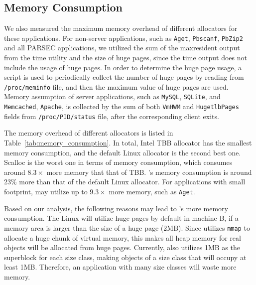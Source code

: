 \subsection{Memory Consumption}
\label{sec:memory}

We also measured the maximum memory overhead of different allocators for these applications. For non-server applications, such as \texttt{Aget}, \texttt{Pbscanf}, \texttt{PbZip2} and all PARSEC applications, we utilized the sum of the maxresident output from the time utility and the size of huge pages, since the time output does not include the usage of huge pages. In order to determine the huge page usage, a script is used to periodically collect the number of huge pages by reading from \texttt{/proc/meminfo} file, and then the maximum value of huge pages are used. Memory assumption of server applications, such as \texttt{MySQL}, \texttt{SQLite}, and \texttt{Memcached}, \texttt{Apache}, is collected by the sum of both \texttt{VmHWM} and \texttt{HugetlbPages} fields from \texttt{/proc/PID/status} file, after the corresponding client exits. 




The memory overhead of different allocators is listed in Table~\ref{tab:memory_consumption}. In total, Intel TBB allocator has the smallest memory consumption, and the default Linux allocator is the second best one. Scalloc is the worst one in terms of memory consumption, which consumes around  $8.3\times$ more memory that that of TBB.  \NM{}'s memory consumption is around 23\% more than that of the default Linux allocator. For applications with small footprint, \NM{} may utilize up to $9.3\times$ more memory, such as \texttt{Aget}.
 
 Based on our analysis, the following reasons may lead to \NM{}'s more memory consumption. The Linux will utilize huge pages by default in machine B, if a memory area is larger than the size of a huge page (2MB). Since \NM{} utilizes \texttt{mmap} to allocate a huge chunk of virtual memory, this makes all heap memory for real objects will be allocated from huge pages. Currently, \NM{} also utilizes 1MB as the superblock for each size class, making objects of a size class that will occupy at least 1MB. Therefore, an application with many size classes will waste more memory.  
 
    

